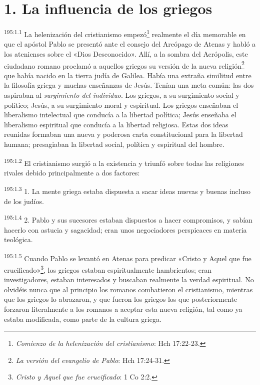\section*{1. La influencia de los griegos}
\par 
\textsuperscript{195:1.1} La helenización del cristianismo empezó\footnote{\textit{Comienzo de la helenización del cristianismo}: Hch 17:22-23.} realmente el día memorable en que el apóstol Pablo se presentó ante el consejo del Areópago de Atenas y habló a los atenienses sobre el «Dios Desconocido». Allí, a la sombra del Acrópolis, este ciudadano romano proclamó a aquellos griegos su versión de la nueva religión\footnote{\textit{La versión del evangelio de Pablo}: Hch 17:24-31.} que había nacido en la tierra judía de Galilea. Había una extraña similitud entre la filosofía griega y muchas enseñanzas de Jesús. Tenían una meta común: las dos aspiraban al \textit{surgimiento del individuo}. Los griegos, a su surgimiento social y político; Jesús, a su surgimiento moral y espiritual. Los griegos enseñaban el liberalismo intelectual que conducía a la libertad política; Jesús enseñaba el liberalismo espiritual que conducía a la libertad religiosa. Estas dos ideas reunidas formaban una nueva y poderosa carta constitucional para la libertad humana; presagiaban la libertad social, política y espiritual del hombre.

\par 
\textsuperscript{195:1.2} El cristianismo surgió a la existencia y triunfó sobre todas las religiones rivales debido principalmente a dos factores:

\par 
\textsuperscript{195:1.3} 1. La mente griega estaba dispuesta a sacar ideas nuevas y buenas incluso de los judíos.

\par 
\textsuperscript{195:1.4} 2. Pablo y sus sucesores estaban dispuestos a hacer compromisos, y sabían hacerlo con astucia y sagacidad; eran unos negociadores perspicaces en materia teológica.

\par 
\textsuperscript{195:1.5} Cuando Pablo se levantó en Atenas para predicar «Cristo y Aquel que fue crucificado»\footnote{\textit{Cristo y Aquel que fue crucificado}: 1 Co 2:2.}, los griegos estaban espiritualmente hambrientos; eran investigadores, estaban interesados y buscaban realmente la verdad espiritual. No olvidéis nunca que al principio los romanos combatieron el cristianismo, mientras que los griegos lo abrazaron, y que fueron los griegos los que posteriormente forzaron literalmente a los romanos a aceptar esta nueva religión, tal como ya estaba modificada, como parte de la cultura griega.


